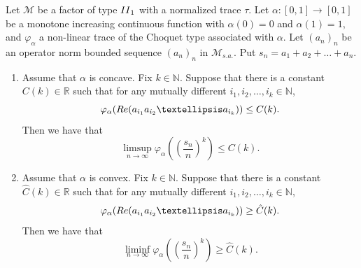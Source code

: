 \documentclass[10pt,a4paper]{amsart}
\newcommand{\M}{\mathcal{M}}
\newcommand{\N}{\mathbb{N}}
\begin{document}
\begin{theorem} \label{psudo law of large numbers}
Let $\M$ be a factor of type ${\rm II}_1$ with a normalized trace $\tau$.  
Let $\alpha: [0,1]  \rightarrow [0, 1]$ be a monotone increasing continuous function with $\alpha(0) = 0$ 
and $\alpha(1) = 1$, and
$\varphi_{\alpha}$ a non-linear trace of the Choquet type associated with $\alpha$.  
Let $(a_n)_n$ be an operator norm bounded sequence $(a_n)_n$ in ${\M}_{s.a.}$. 
Put $s_n = a_1 + a_2 + \dots +a_n$.  
\begin{enumerate}
\item[(1)] Assume that  $\alpha$ is concave. Fix $k \in  \N$. Suppose that there is a constant 
$C(k) \in {\mathbb R}$ such that  
for any mutually different $i_1, i_2, \dots, i_k \in \N$, 
$$
\varphi_{\alpha}({\rm Re} (a_{i_1}a_{i_2} \dots a_{i_k}) ) \leq C(k).  
$$
Then we have that 
\[  \limsup _{n \to \infty}  \varphi_{\alpha}((\frac{s_n}{n})^k) \leq C(k) .\]
\item[(2)] Assume that  $\alpha$ is convex. Fix $k \in  \N$. Suppose that there is a constant 
$\hat{C}(k) \in {\mathbb R}$ such that  
for any mutually different $i_1, i_2, \dots, i_k \in \N$,   
$$
\varphi_{\alpha}({\rm Re} (a_{i_1}a_{i_2} \dots a_{i_k}) ) \geq \hat{C}(k). 
$$
Then we have that 
\[  \liminf _{n \to \infty}  \varphi_{\alpha}((\frac{s_n}{n})^k) \geq \hat{C}(k) .\]
\end{enumerate}
\end{theorem}
\end{document}
